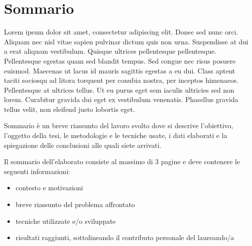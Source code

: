 \chapter*{Sommario} %
\label{sommario}


Lorem ipsum dolor sit amet, consectetur adipiscing elit. Donec sed nunc orci. Aliquam nec nisl vitae sapien pulvinar dictum quis non urna. Suspendisse at dui a erat aliquam vestibulum. Quisque ultrices pellentesque pellentesque. Pellentesque egestas quam sed blandit tempus. Sed congue nec risus posuere euismod. Maecenas ut lacus id mauris sagittis egestas a eu dui. Class aptent taciti sociosqu ad litora torquent per conubia nostra, per inceptos himenaeos. Pellentesque at ultrices tellus. Ut eu purus eget sem iaculis ultricies sed non lorem. Curabitur gravida dui eget ex vestibulum venenatis. Phasellus gravida tellus velit, non eleifend justo lobortis eget.

Sommario è un breve riassunto del lavoro svolto dove si descrive l'obiettivo, l'oggetto della tesi, le metodologie e le tecniche usate, i dati elaborati e la spiegazione delle conclusioni alle quali siete arrivati.  

Il sommario dell’elaborato consiste al massimo di 3 pagine e deve contenere le seguenti informazioni:
\begin{itemize}
  \item contesto e motivazioni 
  \item breve riassunto del problema affrontato
  \item tecniche utilizzate e/o sviluppate
  \item risultati raggiunti, sottolineando il contributo personale del laureando/a
\end{itemize}




